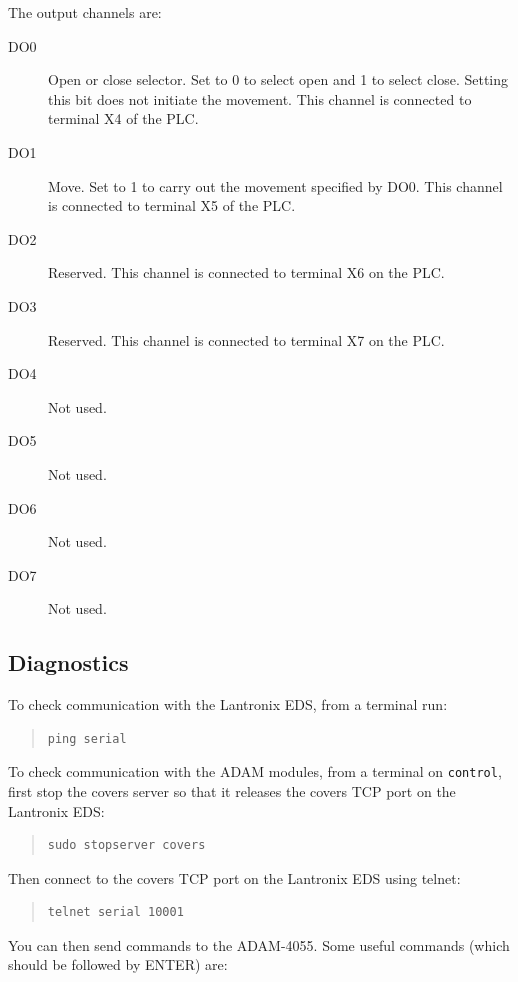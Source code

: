 The output channels are:
\begin{description}
\item[DO0] Open or close selector. Set to 0 to select open and 1 to select close. Setting this bit does not initiate the movement.
This channel is connected to terminal X4 of the PLC.
\item[DO1] Move. Set to 1 to carry out the movement specified by DO0. This channel is connected to terminal X5 of the PLC.
\item[DO2] Reserved. This channel is connected to terminal X6 on the PLC.
\item[DO3] Reserved. This channel is connected to terminal X7 on the PLC.
\item[DO4] Not used.
\item[DO5] Not used.
\item[DO6] Not used.
\item[DO7] Not used.
\end{description}

\subsection{Diagnostics}

To check communication with the Lantronix EDS, from a terminal run:

\begin{quotation}
\begin{verbatim}
ping serial
\end{verbatim}
\end{quotation}

To check communication with the ADAM modules, from a terminal on \verb|control|, first stop the covers server so that it releases the covers TCP port on the Lantronix EDS:

\begin{quotation}
\begin{verbatim}
sudo stopserver covers
\end{verbatim}
\end{quotation}

Then connect to the covers TCP port on the Lantronix EDS using telnet:

\begin{quotation}
\begin{verbatim}
telnet serial 10001
\end{verbatim}
\end{quotation}

You can then send commands to the ADAM-4055. Some useful commands (which should be followed by ENTER) are:

